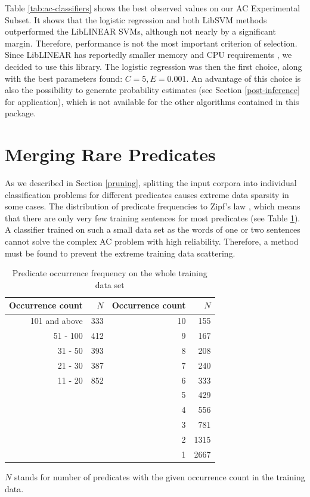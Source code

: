 \documentclass[12pt,notitlepage]{report}
\begin{document}
Table \ref{tab:ac-classifiers} shows the best observed values on our AC Experimental Subset. It shows that the logistic regression and both LibSVM methods outperformed the LibLINEAR SVMs, although not nearly by a significant margin. Therefore, performance is not the most important criterion of selection. Since LibLINEAR has reportedly smaller memory and CPU requirements \citep[our experiments were not designed to measure this, cf.][]{fan08}, we decided to use this library. The logistic regression was then the first choice, along with the best parameters found: $C = 5, E = 0.001$. An advantage of this choice is also the possibility to generate probability estimates (see Section \ref{post-inference} for application), which is not available for the other algorithms contained in this package.

\section{Merging Rare Predicates}\label{ac-merge}

As we described in Section \ref{pruning}, splitting the input corpora into individual classification problems for different predicates causes extreme data sparsity in some cases. The distribution of predicate frequencies to Zipf's law \citep[p. 23ff.]{manning00}, which means that there are only very few training sentences for most predicates (see Table \ref{tab:pred-freq}). A classifier trained on such a small data set as the words of one or two sentences cannot solve the complex AC problem with high reliability. Therefore, a method must be found to prevent the extreme training data scattering.

\begin{table}[htb]\footnotesize
\caption{Predicate occurrence frequency on the whole training data set}\label{tab:pred-freq}
\begin{center}
\begin{tabular}{|r|r||r|r|}\hline
\bf Occurrence count & \bf $N$ & \bf Occurrence count & \bf $N$ \\\hline
101 and above & 333 & 10 & 155 \\\cline{1-2}
51 - 100 & 412 & 9 & 167 \\
31 - 50 & 393 & 8 & 208 \\\cline{1-2}
21 - 30 & 387 & 7 & 240 \\
11 - 20 & 852 & 6 & 333 \\\cline{1-2}
\multicolumn{2}{c|}{}& 5 & 429 \\
\multicolumn{2}{c|}{}& 4 & 556 \\
\multicolumn{2}{c|}{}& 3 & 781 \\
\multicolumn{2}{c|}{}& 2 & 1315 \\
\multicolumn{2}{c|}{}& 1 & 2667 \\\cline{3-4}
\end{tabular}
\end{center}
$N$ stands for number of predicates with the given occurrence count in the training data.
\end{table}
\end{document}
